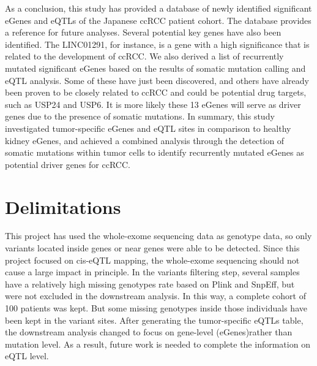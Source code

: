 As a conclusion, this study has provided a database of newly identified significant eGenes and eQTLs of the Japanese ccRCC patient cohort. The database provides a reference for future analyses. Several potential key genes have also been identified. The LINC01291, for instance, is a gene with a high significance that is related to the development of ccRCC. We also derived a list of recurrently mutated significant eGenes based on the results of somatic mutation calling and eQTL analysis. Some of these have just been discovered, and others have already been proven to be closely related to ccRCC and could be potential drug targets, such as USP24 and USP6. It is more likely these 13 eGenes will serve as driver genes due to the presence of somatic mutations.  In summary, this study investigated tumor-specific eGenes and eQTL sites in comparison to healthy kidney eGenes, and achieved a combined analysis through the detection of somatic mutations within tumor cells to identify recurrently mutated eGenes as potential driver genes for ccRCC.

\section{Delimitations}

This project has used the whole-exome sequencing data as genotype data, so only variants located inside genes or near genes were able to be detected. Since this project focused on cis-eQTL mapping, the whole-exome sequencing should not cause a large impact in principle. In the variants filtering step, several samples have a relatively high missing genotypes rate based on Plink and SnpEff, but were not excluded in the downstream analysis.  In this way, a complete cohort of 100 patients was kept. But some missing genotypes inside those individuals have been kept in the variant sites. After generating the tumor-specific eQTLs table, the downstream analysis changed to focus on gene-level (eGenes)rather than mutation level. As a result, future work is needed to complete the information on eQTL level.